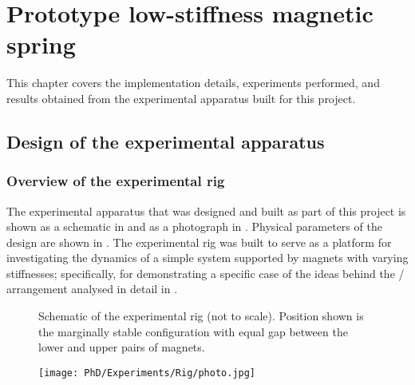 \documentclass[11pt,a4paper]{memoir}
\begin{document}
\chapter{Prototype low-stiffness magnetic spring}

This chapter covers the implementation details, experiments performed,
and results obtained from the experimental apparatus built for this
project.

\section{Design of the experimental apparatus}

\subsection{Overview of the experimental rig}

The experimental apparatus that was designed and built as part of this project
is shown as a schematic in  and as a photograph in
. Physical parameters of the design are shown in
. The experimental rig was built to serve as a platform for
investigating the dynamics of a simple system supported by magnets with
varying stiffnesses; specifically, for demonstrating a specific case of
the ideas behind the \qzs/ arrangement analysed in detail in .

\begin{figure}
  \begin{wide}
  \end{wide}
  \caption[Schematic of the experimental rig.]{
    Schematic of the experimental rig (not to scale). Position shown is
    the marginally stable configuration with equal gap between the lower
    and upper pairs of magnets.}
\end{figure}

\begin{figure}
  \texttt{[image: PhD/Experiments/Rig/photo.jpg]}
\end{figure}
\end{document}

